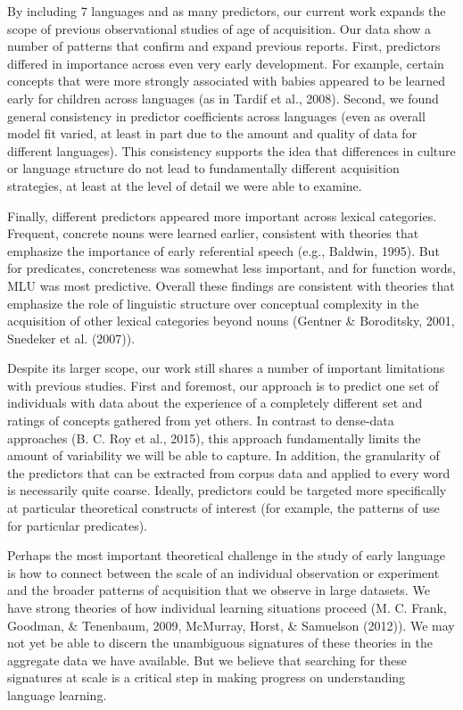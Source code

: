 \documentclass[10pt, letterpaper]{article}
\begin{document}
By including 7 languages and as many predictors, our current work
expands the scope of previous observational studies of age of
acquisition. Our data show a number of patterns that confirm and expand
previous reports. First, predictors differed in importance across even
very early development. For example, certain concepts that were more
strongly associated with babies appeared to be learned early for
children across languages (as in Tardif et al., 2008). Second, we found
general consistency in predictor coefficients across languages (even as
overall model fit varied, at least in part due to the amount and quality
of data for different languages). This consistency supports the idea
that differences in culture or language structure do not lead to
fundamentally different acquisition strategies, at least at the level of
detail we were able to examine.

Finally, different predictors appeared more important across lexical
categories. Frequent, concrete nouns were learned earlier, consistent
with theories that emphasize the importance of early referential speech
(e.g., Baldwin, 1995). But for predicates, concreteness was somewhat
less important, and for function words, MLU was most predictive. Overall
these findings are consistent with theories that emphasize the role of
linguistic structure over conceptual complexity in the acquisition of
other lexical categories beyond nouns (Gentner \& Boroditsky, 2001,
Snedeker et al. (2007)).

Despite its larger scope, our work still shares a number of important
limitations with previous studies. First and foremost, our approach is
to predict one set of individuals with data about the experience of a
completely different set and ratings of concepts gathered from yet
others. In contrast to dense-data approaches (B. C. Roy et al., 2015),
this approach fundamentally limits the amount of variability we will be
able to capture. In addition, the granularity of the predictors that can
be extracted from corpus data and applied to every word is necessarily
quite coarse. Ideally, predictors could be targeted more specifically at
particular theoretical constructs of interest (for example, the patterns
of use for particular predicates).

Perhaps the most important theoretical challenge in the study of early
language is how to connect between the scale of an individual
observation or experiment and the broader patterns of acquisition that
we observe in large datasets. We have strong theories of how individual
learning situations proceed (M. C. Frank, Goodman, \& Tenenbaum, 2009,
McMurray, Horst, \& Samuelson (2012)). We may not yet be able to discern
the unambiguous signatures of these theories in the aggregate data we
have available. But we believe that searching for these signatures at
scale is a critical step in making progress on understanding language
learning.
\end{document}
